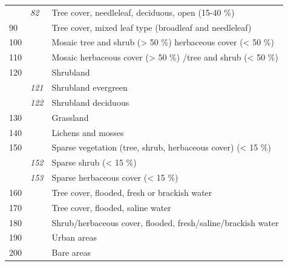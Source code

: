 \begin{table}[htbp]
\begin{tabular}{lll}
    & \textit{82}          & Tree cover, needleleaf, deciduous, open (15-40 \%)                  \\
    90                       &                      & Tree cover, mixed leaf type (broadleaf and needleleaf)              \\
    100                      &                      & Mosaic tree and shrub (> 50 \%) herbaceous cover (< 50 \%)          \\
    110                      &                      & Mosaic herbaceous cover (> 50 \%) /tree and shrub (< 50 \%)         \\
    120                      &                      & Shrubland                                                           \\
    & \textit{121}         & Shrubland evergreen                                                 \\
    & \textit{122}         & Shrubland deciduous                                                 \\
    130                      &                      & Grassland                                                           \\
    140                      &                      & Lichens and mosses                                                  \\
    150                      &                      & Sparse vegetation (tree, shrub, herbaceous cover) (< 15 \%)         \\
    & \textit{152}         & Sparse shrub (< 15 \%)                                              \\
    & \textit{153}         & Sparse herbaceous cover (< 15 \%)                                   \\
    160                      &                      & Tree cover, flooded, fresh or brackish water                        \\
    170                      &                      & Tree cover, flooded, saline water                                   \\
    180                      &                      & Shrub/herbaceous cover, flooded, fresh/saline/brackish water        \\
    190                      &                      & Urban areas                                                         \\
    200                      &                      & Bare areas                                                          \\

\end{tabular}
\end{table}

